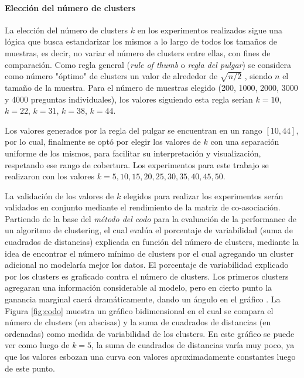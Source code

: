 \paragraph{Elección del número de clusters}
La elección del número de clusters \(k\) en los experimentos realizados sigue una lógica que busca estandarizar los mismos a lo largo de todos los tamaños de muestras, es decir, no variar el número de clusters entre ellas, con fines de comparación. Como regla general (\textit{rule of thumb} o \textit{regla del pulgar}) se considera como número "óptimo" de clusters un valor de alrededor de \(\sqrt{n/2}\) \citep{kodinariya2013review}, siendo \(n\) el tamaño de la muestra. Para el número de muestras elegido (200, 1000, 2000, 3000 y 4000 preguntas individuales), los valores siguiendo esta regla serían \(k = 10\), \(k = 22\), \(k = 31\), \(k = 38\), \(k =44\).

\bigskip Los valores generados por la regla del pulgar se encuentran en un rango \([10, 44]\), por lo cual, finalmente se optó por elegir los valores de \(k\) con una separación uniforme de los mismos, para facilitar su interpretación y visualización, respetando ese rango de cobertura. Los experimentos para este trabajo se realizaron con los valores \(k = 5, 10, 15, 20, 25, 30, 35, 40, 45, 50\).

\bigskip La validación de los valores de \(k\) elegidos para realizar los experimentos serán validados en conjunto mediante el rendimiento de la matriz de co-asociación. Partiendo de la base del \textit{método del codo} para la evaluación de la performance de un algoritmo de clustering, el cual evalúa el porcentaje de variabilidad (suma de cuadrados de distancias) explicada en función del número de clusters, mediante la idea de encontrar el número mínimo de clusters por el cual agregando un cluster adicional no modelaría mejor los datos. El porcentaje de variabilidad explicado por los clusters es graficado contra el número de clusters. Los primeros clusters agregaran una información considerable al modelo, pero en cierto punto la ganancia marginal caerá dramáticamente, dando un ángulo en el gráfico \citep{bholowalia2014ebk}. La Figura \ref{fig:codo} muestra un gráfico bidimensional en el cual se compara el número de clusters (en abscisas) y la suma de cuadrados de distancias (en ordenadas) como medida de variabilidad de los clusters. En este gráfico se puede ver como luego de \(k = 5\), la suma de cuadrados de distancias varía muy poco, ya que los valores esbozan una curva con valores aproximadamente constantes luego de este punto.

